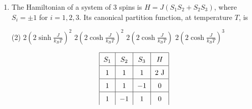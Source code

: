 \begin{enumerate}
	{}
	\begin{tasks}(4)
		\task[\textbf{a.}] $\frac{e^{-\beta J}}{\left(e^{\beta J}+e^{-\beta J}\right)}$
		\task[\textbf{b.}] $e^{-2 \beta J}$
		\task[\textbf{c.}] $\tanh (\beta J)$
		\task[\textbf{d.}] $\operatorname{coth}(\beta J)$
	\end{tasks}
\begin{answer}
	\begin{align*}
	\left\langle\sigma_{i} \cdot \sigma_{i+1}\right\rangle&=\frac{\sum \sigma_{i} \cdot \sigma_{i+1}}{N-1}=\frac{\sum \sigma_{i} \cdot \sigma_{i+1}}{N} N>>1=\frac{1-1}{-J N}\hspace{1cm}\text{(i)}\\
	\text{For such an Ising model for }&N>>1\\
	z&=(\cosh \beta J)^{N}\\
	\text{Average Energy }&=\frac{-\partial}{\partial \beta} \ln z\\
	&=-N \frac{1}{\cosh \beta J} \sinh \beta J \cdot J\\
	&=-N J \tanh \beta J\hspace{4cm}\text{(ii)}\\
	\left\langle\sigma_{i} \cdot \sigma_{i+1}\right\rangle&=\frac{-N j \tanh \beta j}{-j N}=\tanh \beta j
	\end{align*}
	So the correct answer is \textbf{Option (c)}
\end{answer}
	\item  The Hamiltonian of a system of 3 spins is $H=J\left(S_{1} S_{2}+S_{2} S_{3}\right)$, where $S_{i}=\pm 1$ for $i=1,2,3$. Its canonical partition function, at temperature $T$, is
	{ }
	\begin{tasks}(2)
		\task[\textbf{a.}] $2\left(2 \sinh \frac{J}{k_{B} T}\right)^{2}$
		\task[\textbf{b.}]  $2\left(2 \cosh \frac{J}{k_{B} T}\right)^{2}$
		\task[\textbf{c.}]  $2\left(2 \cosh \frac{J}{k_{B} T}\right)$
		\task[\textbf{d.}] $2\left(2 \cosh \frac{J}{k_{B} T}\right)^{3}$
	\end{tasks}
\begin{answer}
	\begin{align*}
	\renewcommand*{\arraystretch}{1.5}
	\begin{tabular}{|c|c|c|c|}
	\hline$S_{1}$ & $S_{2}$ & $S_{3}$ & $H$ \\
	\hline 1 & 1 & 1 & $2 \mathrm{~J}$ \\
	\hline 1 & 1 & $-1$ & 0 \\
	\hline 1 & $-1$ & 1 & 0 \\

\end{tabular}
\end{align*}
\end{answer}
\end{enumerate}
